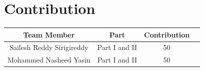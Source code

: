 \documentclass{article} %
\begin{document}
\section{Contribution}

\begin{center}
    \begin{tabular}{cccc}
        \toprule
        Team Member & Part & Contribution \\
        \midrule
        Sailesh Reddy Sirigireddy & Part I and II & 50 \\
        Mohammed Nasheed Yasin & Part I and II & 50 \\
        \bottomrule
    \end{tabular}
\end{center}

\printbibliography
\end{document}
